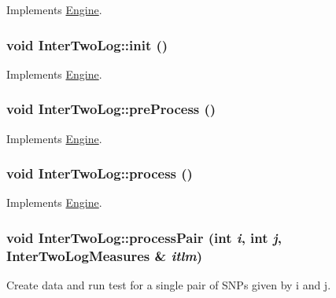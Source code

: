 Implements \hyperlink{classEngine_a023e094182312b1732fe53754c2fe5cb}{Engine}.

\hypertarget{classInterTwoLog_af5dbc57497069c182c6101211fe2b64a}{
\subsubsection[{init}]{\setlength{\rightskip}{0pt plus 5cm}void InterTwoLog::init ()}}
\label{classInterTwoLog_af5dbc57497069c182c6101211fe2b64a}


Implements \hyperlink{classEngine_aaa054d596fb8ced6e3eb4bee208f8c3d}{Engine}.

\hypertarget{classInterTwoLog_a581fcf71571bce5c0861e963c16f220b}{
\subsubsection[{preProcess}]{\setlength{\rightskip}{0pt plus 5cm}void InterTwoLog::preProcess ()}}
\label{classInterTwoLog_a581fcf71571bce5c0861e963c16f220b}


Implements \hyperlink{classEngine_aec7076b8979a13c96eceb362437dc68c}{Engine}.

\hypertarget{classInterTwoLog_abd4e1bdf33314432d4a57193de056905}{
\subsubsection[{process}]{\setlength{\rightskip}{0pt plus 5cm}void InterTwoLog::process ()}}
\label{classInterTwoLog_abd4e1bdf33314432d4a57193de056905}


Implements \hyperlink{classEngine_a005f8e277c3dea16ea05803fba223db7}{Engine}.

\hypertarget{classInterTwoLog_ac83b4a0881e7d882fad88e25833cc565}{
\subsubsection[{processPair}]{\setlength{\rightskip}{0pt plus 5cm}void InterTwoLog::processPair (int {\em i}, \/  int {\em j}, \/  {\bf InterTwoLogMeasures} \& {\em itlm})}}
\label{classInterTwoLog_ac83b4a0881e7d882fad88e25833cc565}
Create data and run test for a single pair of SNPs given by i and j.


